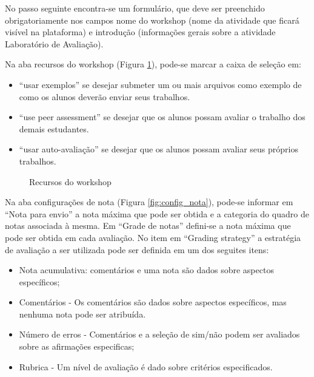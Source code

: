 No passo seguinte encontra-se um formulário, que deve ser preenchido obrigatoriamente nos campos nome do workshop (nome da atividade que ficará visível na plataforma) e introdução (informações gerais sobre a atividade Laboratório de Avaliação).

Na aba recursos do workshop (Figura \ref{fig:recursos_work}), pode-se marcar a caixa de seleção em:

\begin{itemize}
 \item “usar exemplos” se desejar submeter um ou mais arquivos como exemplo de como os alunos deverão enviar seus trabalhos.
 \item “use peer assessment” se desejar que os alunos possam avaliar o trabalho dos demais estudantes.
 \item “usar auto-avaliação” se desejar que os alunos possam avaliar seus próprios trabalhos.
\end{itemize}

\begin{figure}
 \begin{center}
  \caption{Recursos do workshop}
  \label{fig:recursos_work}
 \end{center}
\end{figure}

Na aba configurações de nota (Figura \ref{fig:config_nota}), pode-se informar em “Nota para envio” a nota máxima que pode ser obtida e a categoria do quadro de notas associada à mesma. Em “Grade de notas” defini-se a nota máxima que pode ser obtida em cada avaliação. No item em “Grading strategy” a estratégia de avaliação a ser utilizada pode ser definida em um dos seguites itens:

\begin{itemize}
 \item Nota acumulativa: comentários e uma nota são dados sobre aspectos específicos;
 \item Comentários - Os comentários são dados sobre aspectos específicos, mas nenhuma nota pode ser atribuída.
 \item Número de erros - Comentários e a seleção de sim/não podem ser avaliados sobre as afirmações especificas;
 \item Rubrica - Um nível de avaliação é dado sobre critérios especificados.
 \end{itemize}

